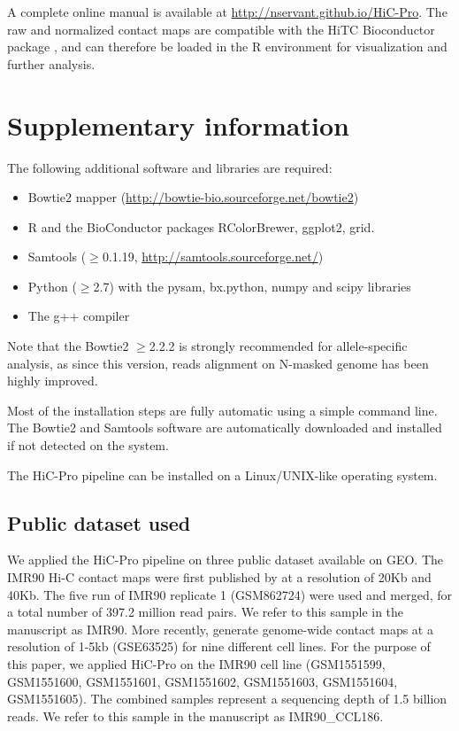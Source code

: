 A complete online manual is available at
\href{http://nservant.github.io/HiC-Pro}{http://nservant.github.io/HiC-Pro}.
The raw and normalized contact maps are compatible with the HiTC Bioconductor
package \citep{servant:hitc}, and can therefore be loaded in the R environment for
visualization and further analysis.

\section*{Supplementary information}

The following additional software and libraries are required:
\begin{itemize}
\item Bowtie2 mapper \citep{langmead:fast}
(\href{http://bowtie-bio.sourceforge.net/bowtie2}{http://bowtie-bio.sourceforge.net/bowtie2})
\item R and the BioConductor packages RColorBrewer, ggplot2, grid.
\item Samtools ($\geq$0.1.19,
\href{http://samtools.sourceforge.net/}{http://samtools.sourceforge.net/})
\item Python ($\geq$2.7) with the pysam, bx.python, numpy and scipy libraries
\item The g++ compiler
\end{itemize}

Note that the Bowtie2 $\geq$2.2.2 is strongly recommended for allele-specific
analysis, as since this version, reads alignment on N-masked genome has been
highly improved.

Most of the installation steps are fully automatic using a simple command
line. The Bowtie2 and Samtools software are automatically downloaded and
installed if not detected on the system.

The HiC-Pro pipeline can be installed on a Linux/UNIX-like operating system.

\subsection*{Public dataset used}

We applied the HiC-Pro pipeline on three public dataset available on GEO. The
IMR90 Hi-C contact maps were first published by \citet{dixon:topological} at a
resolution of 20Kb and 40Kb. The five run of IMR90 replicate 1 (GSM862724)
were used and merged, for a total number of 397.2 million read pairs. We refer
to this sample in the manuscript as IMR90. More recently, \citet{rao:3d}
generate genome-wide contact maps at a resolution of 1-5kb (GSE63525) for nine
different cell lines. For the purpose of this paper, we applied HiC-Pro on the
IMR90 cell line (GSM1551599, GSM1551600, GSM1551601, GSM1551602, GSM1551603,
GSM1551604, GSM1551605). The combined samples represent a sequencing depth of
1.5 billion reads. We refer to this sample in the manuscript as IMR90\_CCL186.

